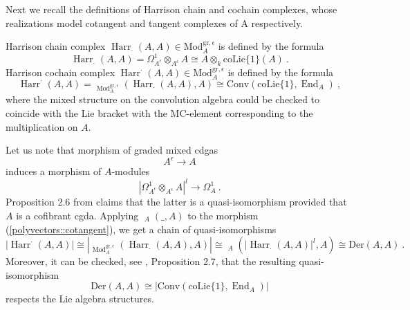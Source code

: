 \documentclass[10pt, oneside]{amsart}
\theoremstyle{plain}
\newcommand{\colie}{\mathrm{coLie}}
\newcommand{\conv}{\mathrm{Conv}}
\newcommand{\der}{\text{Der}}
\DeclareMathOperator{\en}{End}
\DeclareMathOperator{\harr}{Harr}
\DeclareMathOperator{\uhom}{\underline{Hom}}
\begin{document}
Next we recall the definitions of Harrison chain and cochain complexes, whose realizations model cotangent and tangent complexes of A 
respectively.
\begin{definition}
Harrison chain complex $\harr_\cdot(A,A) \in \text{Mod}_A^{\text{gr}, \epsilon}$ is defined by the formula
\begin{equation*}
\harr_\cdot(A,A) = \Omega^1_{A^\epsilon} \otimes_{A^\epsilon} A \cong A \otimes_k \colie\{1\}(A) \:.
\end{equation*}
Harrison cochain complex $\harr^\cdot(A,A) \in \text{Mod}_A^{\text{gr}, \epsilon}$ is defined by the formula
\begin{equation*}
\harr^\cdot(A,A) = \uhom_{\text{Mod}_A^{\text{gr}, \epsilon}} (\harr_\cdot(A,A), A) \cong \conv(\colie\{1\}, \en_A) \:,
\end{equation*}
where the mixed structure on the convolution algebra could be checked to coincide with the Lie bracket with the MC-element 
corresponding to the  multiplication on $A$.
\end{definition}

Let us note that morphism of graded mixed cdgas
\begin{equation*}
A^\epsilon \longrightarrow A
\end{equation*}
induces a morphism of $A$-modules
\begin{equation}\label{polyvectors::cotangent}
|\Omega^1_{A^\epsilon} \otimes_{A^\epsilon} A|^l \longrightarrow \Omega^1_A \:.
\end{equation}
Proposition 2.6 from \cite{Melani_2018} claims that the latter is a quasi-isomorphism provided that $A$ is a cofibrant cgda.
Applying $\uhom_A(\_, A)$ to the morphism (\ref{polyvectors::cotangent}), we get a chain of quasi-isomorphisms
\begin{equation*}
|\harr^\cdot(A,A)| \cong |\uhom_{\text{Mod}_A^{\text{gr}, \epsilon}} (\harr_\cdot(A,A), A)| \cong \uhom_A (|\harr_\cdot(A,A)|^l, A) \cong \der(A,A) \:.
\end{equation*}
Moreover, it can be checked, see \cite{Melani_2018}, Proposition 2.7, that the resulting quasi-isomorphism
\begin{equation*}
\der(A,A) \cong |\conv(\colie\{1\}, \en_A)|
\end{equation*}
respects the Lie algebra structures.
\end{document}
